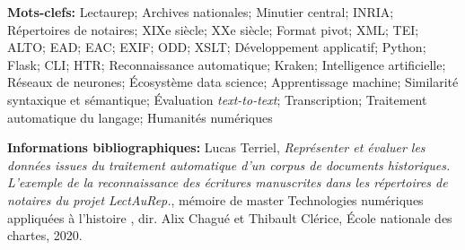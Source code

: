 
\bigskip
\textbf{Mots-clefs:} Lectaurep; Archives nationales; Minutier central; INRIA; Répertoires de notaires; XIXe siècle; XXe siècle; Format pivot; XML; TEI; ALTO; EAD; EAC; EXIF; ODD; XSLT; Développement applicatif; Python; Flask; CLI; HTR; Reconnaissance automatique; Kraken; Intelligence artificielle; Réseaux de neurones; Écosystème data science; Apprentissage machine; Similarité syntaxique et sémantique; Évaluation \textit{text-to-text}; Transcription; Traitement automatique du langage; Humanités numériques

\bigskip
\bigskip
\bigskip

\textbf{Informations bibliographiques:} Lucas Terriel, \textit{Représenter et évaluer les données issues du traitement automatique d'un corpus de documents historiques. L'exemple de la reconnaissance des écritures manuscrites dans les répertoires de notaires du projet LectAuRep.}, mémoire de master \og Technologies numériques appliquées à l'histoire \fg{}, dir. Alix Chagué et Thibault Clérice, École nationale des chartes, 2020.

\clearpage
\thispagestyle{empty}
\cleardoublepage